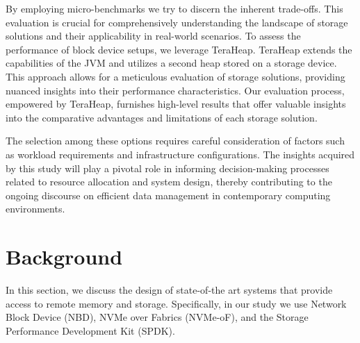 \documentclass[nonacm,sigplan]{acmart}
\begin{document}
 \par By employing micro-benchmarks we try to discern the inherent trade-offs. This
evaluation is crucial for comprehensively understanding the landscape of storage
solutions and their applicability in real-world scenarios. To assess the
performance of block device setups, we leverage TeraHeap. TeraHeap extends the
capabilities of the JVM and utilizes a second heap stored on a storage device.
This approach allows for a meticulous evaluation of storage solutions, providing
nuanced insights into their performance characteristics. Our evaluation process,
empowered by TeraHeap, furnishes high-level results that offer valuable insights
into the comparative advantages and limitations of each storage solution.

\par The selection among these options requires careful consideration of factors such
as workload requirements and infrastructure configurations. The insights
acquired by this study will play a pivotal role in informing decision-making
processes related to resource allocation and system design, thereby contributing
to the ongoing discourse on efficient data management in contemporary computing
environments.



\section{Background}

In this section, we discuss the design of state-of-the art systems that provide
access to remote memory and storage. Specifically, in our study we use Network
Block Device (NBD), NVMe over Fabrics (NVMe-oF), and the Storage Performance
Development Kit (SPDK).
\end{document}
